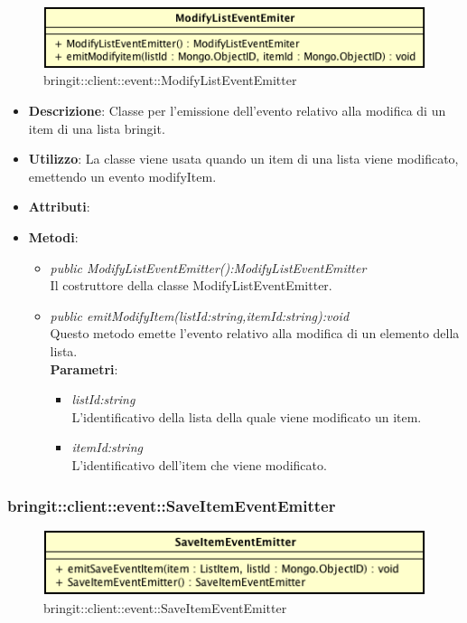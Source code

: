 \label{bringit::client::event::ModifyListEventEmitter}
\begin{figure}[H]
	\centering
	\includegraphics[scale=0.5]{Sezioni/SottosezioniST/img/app/ModifyListEventEmitter.png}
	\caption{bringit::client::event::ModifyListEventEmitter}
\end{figure}

\begin{itemize}
\item \textbf{Descrizione}: Classe per l'emissione dell'evento relativo alla modifica di un item di una lista bringit.
\item \textbf{Utilizzo}: La classe viene usata quando un item di una lista viene modificato, emettendo un evento modifyItem.
\item \textbf{Attributi}: 
\item \textbf{Metodi}:
	\begin{itemize}
	\item \textit{public ModifyListEventEmitter():ModifyListEventEmitter}\\
	Il costruttore della classe ModifyListEventEmitter.
	\item \textit{public emitModifyItem(listId:string,itemId:string):void}\\
	Questo metodo emette l'evento relativo alla modifica di un elemento della lista.
					\\ \textbf{Parametri}: \begin{itemize}
			\item \textit{listId:string}\\
			L'identificativo della lista della quale viene modificato un item.
			\item \textit{itemId:string}\\
			L'identificativo dell'item che viene modificato.
					\end{itemize}
	\end{itemize}
\end{itemize}

\subsubsection{bringit::client::event::SaveItemEventEmitter}

\label{bringit::client::event::SaveItemEventEmitter}
\begin{figure}[H]
	\centering
	\includegraphics[scale=0.5]{Sezioni/SottosezioniST/img/app/SaveItemEventEmitter.png}
	\caption{bringit::client::event::SaveItemEventEmitter}
\end{figure}

